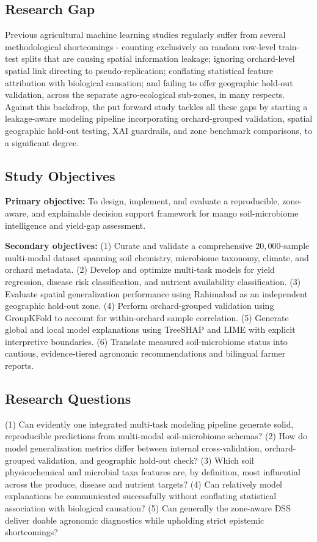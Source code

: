 \documentclass[runningheads,a4paper,oribibl]{llncs}
\begin{document}
\subsection{Research Gap}
Previous agricultural machine learning studies regularly suffer from several methodological shortcomings - counting exclusively on random row-level train-test splits that are causing spatial information leakage; ignoring orchard-level spatial link directing to pseudo-replication; conflating statistical feature attribution with biological causation; and failing to offer geographic hold-out validation, across the separate agro-ecological sub-zones, in many respects. Against this backdrop, the put forward study tackles all these gaps by starting a leakage-aware modeling pipeline incorporating orchard-grouped validation, spatial geographic hold-out testing, XAI guardrails, and zone benchmark comparisons, to a significant degree.

\subsection{Study Objectives}
\textbf{Primary objective:} To design, implement, and evaluate a reproducible, zone-aware, and explainable decision support framework for mango soil-microbiome intelligence and yield-gap assessment.

\textbf{Secondary objectives:}
(1) Curate and validate a comprehensive $20{,}000$-sample multi-modal dataset spanning soil chemistry, microbiome taxonomy, climate, and orchard metadata.
(2) Develop and optimize multi-task models for yield regression, disease risk classification, and nutrient availability classification.
(3) Evaluate spatial generalization performance using Rahimabad as an independent geographic hold-out zone.
(4) Perform orchard-grouped validation using GroupKFold to account for within-orchard sample correlation.
(5) Generate global and local model explanations using TreeSHAP and LIME with explicit interpretive boundaries.
(6) Translate measured soil-microbiome status into cautious, evidence-tiered agronomic recommendations and bilingual farmer reports.

\subsection{Research Questions}
(1) Can evidently one integrated multi-task modeling pipeline generate solid, reproducible predictions from multi-modal soil-microbiome schemas?
(2) How do model generalization metrics differ between internal cross-validation, orchard-grouped validation, and geographic hold-out check?
(3) Which soil physicochemical and microbial taxa features are, by definition, most influential across the produce, disease and nutrient targets?
(4) Can relatively model explanations be communicated successfully without conflating statistical association with biological causation?
(5) Can generally the zone-aware DSS deliver doable agronomic diagnostics while upholding strict epistemic shortcomings?
\end{document}
